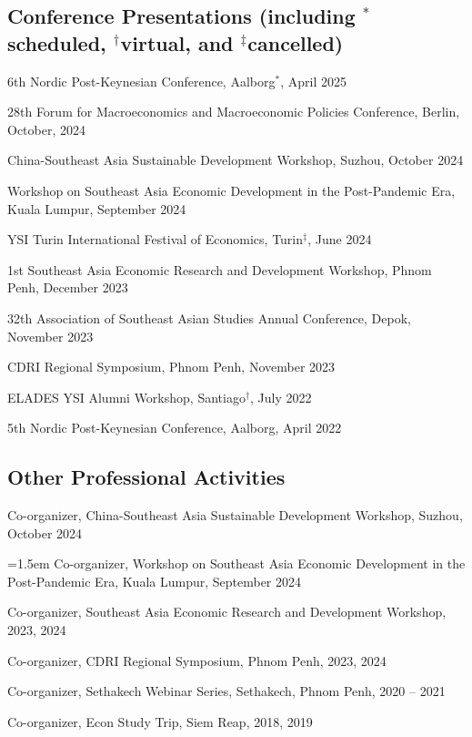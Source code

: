 \documentclass[10pt,a4paper]{article}
\begin{document}
\subsection*{Conference Presentations (including $^\ast$scheduled, $^\dag$virtual, and $^\ddag$cancelled)}

6th Nordic Post-Keynesian Conference, Aalborg$^\ast$, April 2025

28th Forum for Macroeconomics and Macroeconomic Policies Conference, Berlin, October, 2024

China-Southeast Asia Sustainable Development Workshop, Suzhou, October 2024

Workshop on Southeast Asia Economic Development in the Post-Pandemic Era, Kuala Lumpur, September 2024

YSI Turin International Festival of Economics, Turin$^\ddag$, June 2024

1st Southeast Asia Economic Research and Development Workshop, Phnom Penh, December 2023

32th Association of Southeast Asian Studies Annual Conference, Depok, November 2023

CDRI Regional Symposium, Phnom Penh, November 2023

ELADES YSI Alumni Workshop, Santiago$^\dag$, July 2022

5th Nordic Post-Keynesian Conference, Aalborg, April 2022

\subsection*{Other Professional Activities}

	Co-organizer, China-Southeast Asia Sustainable Development Workshop, Suzhou, October 2024

	\hangindent=1.5em
	Co-organizer, Workshop on Southeast Asia Economic Development in the Post-Pandemic Era, Kuala Lumpur, September 2024

	Co-organizer, Southeast Asia Economic Research and Development Workshop, 2023, 2024
	
	Co-organizer, CDRI Regional Symposium, Phnom Penh, 2023, 2024
	
	Co-organizer, Sethakech Webinar Series, Sethakech, Phnom Penh, 2020 -- 2021

	Co-organizer, Econ Study Trip, Siem Reap, 2018, 2019
\end{document}

